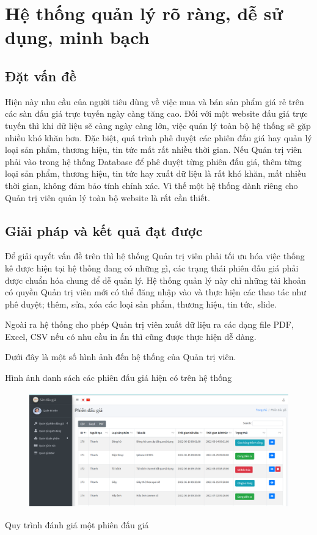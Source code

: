 \documentclass[../DoAn.tex]{subfiles}
\begin{document}
\section{Hệ thống quản lý rõ ràng, dễ sử dụng, minh bạch}
\subsection{Đặt vấn đề}
Hiện này nhu cầu của người tiêu dùng về việc mua và bán sản phẩm giá rẻ trên các sàn đấu giá trực tuyến ngày càng tăng cao. Đối với một website đấu giá trực tuyến thì khi dữ liệu sẽ càng ngày càng lớn, việc quản lý toàn bộ hệ thống sẽ gặp nhiều khó khăn hơn. Đặc biệt, quá trình phê duyệt các phiên đấu giá hay quản lý loại sản phẩm, thương hiệu, tin tức mất rất nhiều thời gian. Nếu Quản trị viên phải vào trong hệ thống Database để phê duyệt từng phiên đấu giá, thêm từng loại sản phẩm, thương hiệu, tin tức hay xuất dữ liệu là rất khó khăn, mất nhiều thời gian, không đảm bảo tính chính xác. Vì thế một hệ thống dành riêng cho Quản trị viên quản lý toàn bộ website là rất cần thiết. 
\subsection{Giải pháp và kết quả đạt được}
Để giải quyết vấn đề trên thì hệ thống Quản trị viên phải tối ưu hóa việc thống kê được hiện tại hệ thống đang có những gì, các trạng thái phiên đấu giá phải được chuẩn hóa chung để dễ quản lý. Hệ thống quản lý này chỉ những tài khoản có quyền Quản trị viên mới có thể đăng nhập vào và thực hiện các thao tác như phê duyệt; thêm, sửa, xóa các loại sản phẩm, thương hiệu, tin tức, slide.

Ngoài ra hệ thống cho phép Quản trị viên xuất dữ liệu ra các dạng file PDF, Excel, CSV nếu có nhu cầu in ấn thì cũng được thực hiện dễ dàng. 

Dưới đây là một số hình ảnh đến hệ thống của Quản trị viên.

Hình ảnh danh sách các phiên đấu giá hiện có trên hệ thống
\begin{figure}[H]
    \centering
    \includegraphics[width=11.4cm,height=5.0cm]{Hinhve/adminmanager.png}
\end{figure}
Quy trình đánh giá một phiên đấu giá
\end{document}
